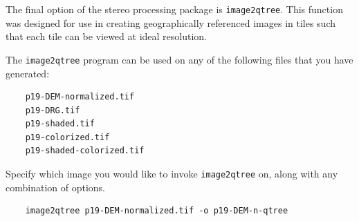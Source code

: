The final option of the stereo processing package is \texttt{image2qtree}.
This function was designed for use in creating geographically
referenced images in tiles such that each tile can be viewed at
ideal resolution.

The \texttt{image2qtree} program can be used on any of the following files that you 
have generated:
\begin{verbatim}
    p19-DEM-normalized.tif
    p19-DRG.tif 
    p19-shaded.tif
    p19-colorized.tif
    p19-shaded-colorized.tif
\end{verbatim}

Specify which image you would like to invoke \texttt{image2qtree} on, along
with any combination of options.

\begin{verbatim}
    image2qtree p19-DEM-normalized.tif -o p19-DEM-n-qtree
\end{verbatim}



